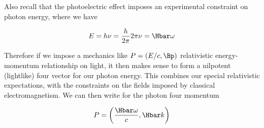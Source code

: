 Also recall that the photoelectric effect imposes an experimental constraint on photon energy, where we have

\begin{equation}\label{eqn:relativisticElectrodynamicsT1:135}
E = h \nu = \frac{h}{2\pi} 2 \pi \nu = \Hbar \omega
\end{equation}

Therefore if we impose a mechanics like \(P = (E/c, \Bp) \) relativistic energy-momentum relationship on light, it then makes sense to form a nilpotent (lightlike) four vector for our photon energy.  This combines our special relativistic expectations, with the constraints on the fields imposed by classical electromagnetism.  We can then write for the photon four momentum

\begin{equation}\label{eqn:relativisticElectrodynamicsT1:136}
P = \left( \frac{\Hbar \omega}{c}, \Hbar k \right)
\end{equation}

